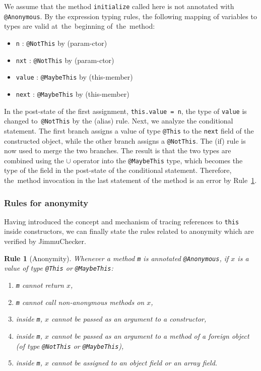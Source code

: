 \documentclass{pracamgr}
\theoremstyle{break}
\theoremstyle{break}
\theoremstyle{break}
\newtheorem{verrule}{Rule}
\begin{document}
We assume that the method \texttt{initialize} called here is not
annotated with \texttt{@Anonymous}. By the expression typing rules,
the following mapping of variables to types are valid at~the~beginning
of~the~method:
\begin{itemize}
\item \texttt{n} : \texttt{@NotThis} by (param-ctor)
\item \texttt{nxt} : \texttt{@NotThis} by (param-ctor)
\item \texttt{value} : \texttt{@MaybeThis} by (this-member)
\item \texttt{next} : \texttt{@MaybeThis} by (this-member)
\end{itemize}
In the post-state of the first assignment, \texttt{this.value = n},
the type of \texttt{value} is changed to~\texttt{@NotThis} by the
(alias) rule. Next, we analyze the conditional statement. The first
branch assigns a value of type \texttt{@This} to the \texttt{next}
field of the constructed object, while the other branch assigns a
\texttt{@NotThis}. The (if) rule is now used to merge the two
branches. The result is that the two types are combined using the
$\cup$ operator into the \texttt{@MaybeThis} type, which becomes the
type of the field in the post-state of the conditional statement.
Therefore, the~method invocation in the last statement of the method
is an error by Rule~\ref{vrl:anon}.

\subsubsection{Rules for anonymity} 

Having introduced the concept and mechanism of tracing references to
\texttt{this} inside constructors, we can finally state the rules
related to anonymity which are verified by JimmuChecker.

\begin{verrule}[Anonymity] \label{vrl:anon}
  Whenever a method \texttt{m} is annotated \texttt{@Anonymous}, if
  $x$ is a value of type \texttt{@This} or \texttt{@MaybeThis}:
  \begin{enumerate}[label=(\arabic*)]
  \item \label{pnt:anon-ret} \texttt{m} cannot return $x$, 
  \item \texttt{m} cannot call non-anonymous methods on $x$, 
  \item inside \texttt{m}, $x$ cannot be passed as an argument to a constructor, 
  \item inside \texttt{m}, $x$ cannot be passed as an argument to a
    method of a foreign object (of type \texttt{@NotThis} or
    \texttt{@MaybeThis}),
  \item inside \texttt{m}, $x$ cannot be assigned to an object field
    or an array field.
  \end{enumerate}
\end{verrule}
\end{document}
